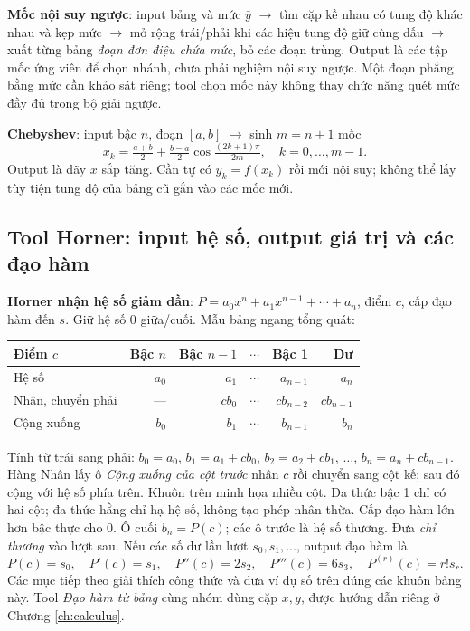 \textbf{Mốc nội suy ngược}: input bảng và mức $\bar y$ $\to$ tìm cặp kề nhau có tung độ khác nhau và kẹp mức $\to$ mở rộng trái/phải khi các hiệu tung độ giữ cùng dấu $\to$ xuất từng bảng \emph{đoạn đơn điệu chứa mức}, bỏ các đoạn trùng. Output là các tập mốc ứng viên để chọn nhánh, chưa phải nghiệm nội suy ngược. Một đoạn phẳng bằng mức cần khảo sát riêng; tool chọn mốc này không thay chức năng quét mức đầy đủ trong bộ giải ngược.

\textbf{Chebyshev}: input bậc $n$, đoạn $[a,b]$ $\to$ sinh $m=n+1$ mốc
\[
x_k=\tfrac{a+b}2+\tfrac{b-a}2\cos\tfrac{(2k+1)\pi}{2m},\quad k=0,\ldots,m-1.
\]
Output là dãy $x$ sắp tăng. Cần tự có $y_k=f(x_k)$ rồi mới nội suy; không thể lấy tùy tiện tung độ của bảng cũ gắn vào các mốc mới.

\subsection{Tool Horner: input hệ số, output giá trị và các đạo hàm}

\textbf{Horner nhận hệ số giảm dần}: $P=a_0x^n+a_1x^{n-1}+\cdots+a_n$, điểm $c$, cấp đạo hàm đến $s$. Giữ hệ số 0 giữa/cuối. Mẫu bảng ngang tổng quát:
\begin{center}\small\setlength{\tabcolsep}{10pt}\begin{tabular}{@{}lrrrr|r@{}}\toprule
Điểm $c$&Bậc $n$&Bậc $n-1$&$\cdots$&Bậc 1&Dư\\\midrule
Hệ số&$a_0$&$a_1$&$\cdots$&$a_{n-1}$&$a_n$\\
Nhân, chuyển phải&---&$cb_0$&$\cdots$&$cb_{n-2}$&$cb_{n-1}$\\\midrule
Cộng xuống&$b_0$&$b_1$&$\cdots$&$b_{n-1}$&$b_n$\\\bottomrule
\end{tabular}\end{center}
Tính từ trái sang phải: $b_0=a_0$, $b_1=a_1+cb_0$, $b_2=a_2+cb_1$, $\ldots$, $b_n=a_n+cb_{n-1}$. Hàng Nhân lấy ô \emph{Cộng xuống của cột trước} nhân $c$ rồi chuyển sang cột kế; sau đó cộng với hệ số phía trên.
Khuôn trên minh họa nhiều cột. Đa thức bậc 1 chỉ có hai cột; đa thức hằng chỉ hạ hệ số, không tạo phép nhân thừa. Cấp đạo hàm lớn hơn bậc thực cho 0.
Ô cuối $b_n=P(c)$; các ô trước là hệ số thương. Đưa \emph{chỉ thương} vào lượt sau. Nếu các số dư lần lượt $s_0,s_1,\ldots$, output đạo hàm là
\[
P(c)=s_0,\quad P'(c)=s_1,\quad P''(c)=2s_2,\quad P'''(c)=6s_3,\quad P^{(r)}(c)=r!s_r.
\]
Các mục tiếp theo giải thích công thức và đưa ví dụ số trên đúng các khuôn bảng này. Tool \emph{Đạo hàm từ bảng} cùng nhóm dùng cặp $x,y$, được hướng dẫn riêng ở Chương \ref{ch:calculus}.
